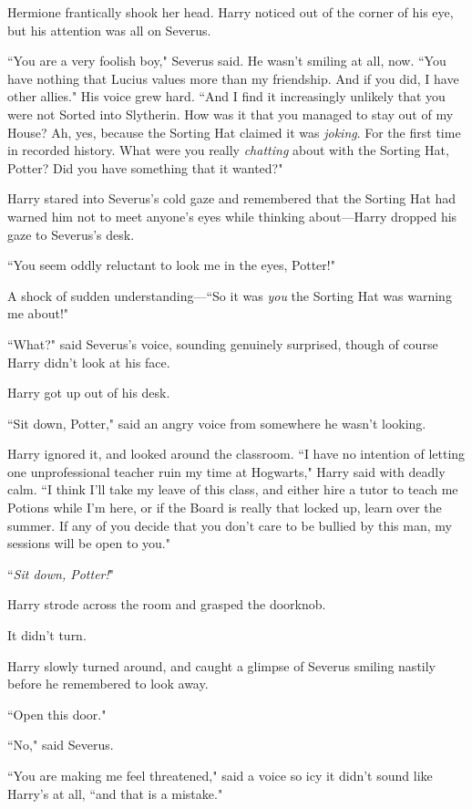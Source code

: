 Hermione frantically shook her head. Harry noticed out of the corner of his eye, but his attention was all on Severus.

``You are a very foolish boy," Severus said. He wasn't smiling at all, now. ``You have nothing that Lucius values more than my friendship. And if you did, I have other allies." His voice grew hard. ``And I find it increasingly unlikely that you were not Sorted into Slytherin. How was it that you managed to stay out of my House? Ah, yes, because the Sorting Hat claimed it was \emph{joking}. For the first time in recorded history. What were you really \emph{chatting} about with the Sorting Hat, Potter? Did you have something that it wanted?"

Harry stared into Severus's cold gaze and remembered that the Sorting Hat had warned him not to meet anyone's eyes while thinking about—Harry dropped his gaze to Severus's desk.

``You seem oddly reluctant to look me in the eyes, Potter!"

A shock of sudden understanding—``So it was \emph{you} the Sorting Hat was warning me about!"

``What?" said Severus's voice, sounding genuinely surprised, though of course Harry didn't look at his face.

Harry got up out of his desk.

``Sit down, Potter," said an angry voice from somewhere he wasn't looking.

Harry ignored it, and looked around the classroom. ``I have no intention of letting one unprofessional teacher ruin my time at Hogwarts," Harry said with deadly calm. ``I think I'll take my leave of this class, and either hire a tutor to teach me Potions while I'm here, or if the Board is really that locked up, learn over the summer. If any of you decide that you don't care to be bullied by this man, my sessions will be open to you."

``\emph{Sit down, Potter!}"

Harry strode across the room and grasped the doorknob.

It didn't turn.

Harry slowly turned around, and caught a glimpse of Severus smiling nastily before he remembered to look away.

``Open this door."

``No," said Severus.

``You are making me feel threatened," said a voice so icy it didn't sound like Harry's at all, ``and that is a mistake."

